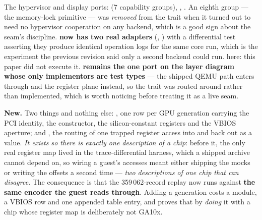 \documentclass[10.5pt]{article}
\begin{document}
The hypervisor and display ports:  (7 capability groups), ,
. An eighth group — the memory-lock primitive — was \emph{removed} from the trait
when it turned out to need no hypervisor cooperation on any backend, which is a good sign about
the seam's discipline. \textbf{ now has two real adapters} (,
) with a differential test asserting they produce identical operation logs for the
same core run, which is the experiment the previous revision said only a second backend could
run. \unver{} here: this paper did not execute it. \textbf{ remains the one port on
the layer diagram whose only implementors are test types} — the shipped QEMU path enters through
 and the register plane instead, so the trait was routed around rather than
implemented, which is worth noticing before treating it as a live seam.

\textbf{New.} Two things and nothing else: , one row per GPU generation
carrying the PCI identity, the  constructor, the silicon-constant registers and
the VBIOS aperture; and , the routing of one trapped register access into
 and back out as a value. \emph{It exists so there is exactly one description of a
chip}: before it, the only real register map lived in the trace-differential harness, which a
shipped archive cannot depend on, so wiring a guest's accesses meant either shipping the mocks or
writing the offsets a second time — \emph{two descriptions of one chip that can disagree}. The
consequence is that the 359\,062-record  replay now runs against \textbf{the same
encoder the guest reads through}. Adding a generation costs a module, a VBIOS row and one
appended table entry, and  proves that by \emph{doing} it with a chip
whose register map is deliberately not GA10x.
\end{document}
